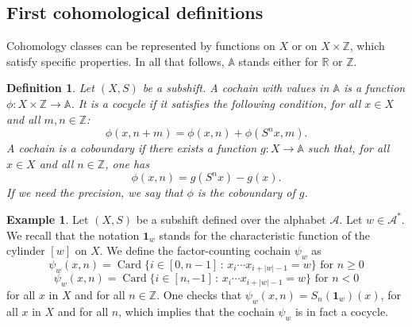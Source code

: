 \documentclass{article}
\newtheorem{definition}[lemma]{Definition}
\theoremstyle{definition}
\newtheorem{example}[lemma]{Example}
\newcommand{\Z}{\mathbb{Z}}
\newcommand{\A}{\mathcal{A}}
\newcommand{\bA}{\mathbb{A}}
\DeclareMathOperator{\Card}{Card}
\begin{document}
\subsection{First cohomological definitions}
Cohomology classes can be represented by functions on $X$ or on $X \times \mathbb Z$, which satisfy specific properties. 
In all that follows,  $\bA$ stands either for  $\mathbb R$ or $\mathbb Z$. 


\begin{definition}\label{def:cochain}
Let $(X,S)$ be a subshift.
 A  {\em cochain} with values in $\bA$ is a function $\phi: X \times \mathbb Z \rightarrow \bA$.
 It is a \emph{cocycle} if it satisfies the  following  condition, for all $x\in X$ and all $m,n \in \Z$: $$\phi(x, n+m) = \phi(x,n) + \phi(S^n x, m).$$
 A cochain is a \emph{coboundary} if there exists a function $g: X \rightarrow \bA$ such that,  for all $x\in X$ and all $n \in \Z$, one has  
 \begin{equation} \label{eq:cob}
 \phi(x,n) = g(S^n x) -  g (x).
 \end{equation}
 If we need the precision, we say that $\phi$ is the coboundary of $g$.
\end{definition}



 
 
 \begin{example}\label{ex:factorcounting}
 Let $(X,S)$  be a subshift defined over the alphabet $\A$. Let $w \in \A^*$.
 We recall that    the notation ${\mathbf 1}_w$     stands  for the characteristic function  of the cylinder $[w]$  on $X$.
We define the factor-counting  cochain  $\psi_w$   as 
  $$\psi_w (x,n) = \Card \bigl\{ i \in [0, n-1]  \,: \,  x_i \cdots x_{i+|w|-1} = w\bigr\}  \mbox{ for } n   \geq 0$$
   $$\psi_w (x,n) = \Card \bigl\{ i \in [n, -1]  \,: \,  x_i \cdots x_{i+|w|-1} = w\bigr\}  \mbox{ for } n <0$$
   for all  $x$ in $X$  and  for all $n \in {\mathbb Z}$.
   One checks that   $ \psi_w (x,n) =S_n ({\mathbf 1}_w) (x)$, for all  $x$ in $X$  and  for all $n$,
which implies that the   cochain $\psi_w$ is in fact  a cocycle.
 \end{example}
 
 
 
\end{document}
